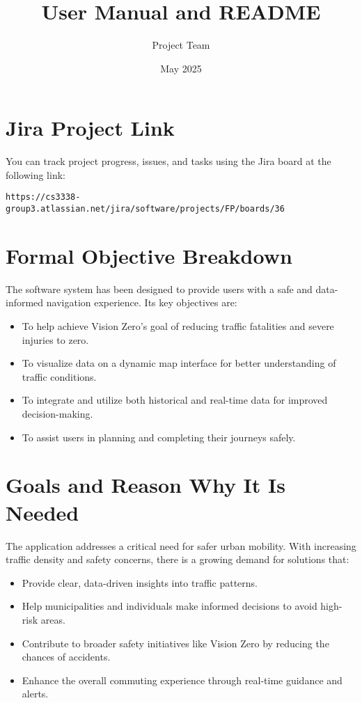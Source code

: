 \documentclass{article}
\title{User Manual and README}
\author{Project Team}
\date{May 2025}
\begin{document}
\maketitle

\section{Jira Project Link}
You can track project progress, issues, and tasks using the Jira board at the following link:
\begin{verbatim}
https://cs3338-group3.atlassian.net/jira/software/projects/FP/boards/36
\end{verbatim}

\section{Formal Objective Breakdown}
The software system has been designed to provide users with a safe and data-informed navigation experience. Its key objectives are:
\begin{itemize}
    \item To help achieve Vision Zero's goal of reducing traffic fatalities and severe injuries to zero.
    \item To visualize data on a dynamic map interface for better understanding of traffic conditions.
    \item To integrate and utilize both historical and real-time data for improved decision-making.
    \item To assist users in planning and completing their journeys safely.
\end{itemize}



\section{Goals and Reason Why It Is Needed}
The application addresses a critical need for safer urban mobility. With increasing traffic density and safety concerns, there is a growing demand for solutions that:
\begin{itemize}
    \item Provide clear, data-driven insights into traffic patterns.
    \item Help municipalities and individuals make informed decisions to avoid high-risk areas.
    \item Contribute to broader safety initiatives like Vision Zero by reducing the chances of accidents.
    \item Enhance the overall commuting experience through real-time guidance and alerts.
\end{itemize}
\end{document}
